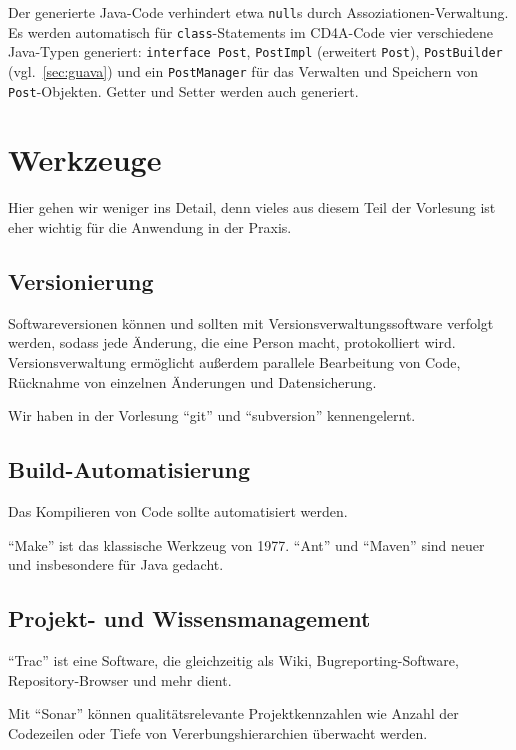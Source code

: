 \documentclass{panikzettel}
\begin{document}
Der generierte Java-Code verhindert etwa \lstinline{null}s durch Assoziationen-Verwaltung. Es werden automatisch für \lstinline{class}-Statements im CD4A-Code vier verschiedene Java-Typen generiert: \lstinline{interface Post}, \lstinline{PostImpl} (erweitert \lstinline{Post}), \lstinline{PostBuilder} (vgl.~\ref{sec:guava}) und ein \lstinline{PostManager} für das Verwalten und Speichern von \lstinline{Post}-Objekten. Getter und Setter werden auch generiert.

\section{Werkzeuge}

Hier gehen wir weniger ins Detail, denn vieles aus diesem Teil der Vorlesung ist eher wichtig für die Anwendung in der Praxis.

\subsection{Versionierung}

Softwareversionen können und sollten mit Versionsverwaltungssoftware verfolgt werden, sodass jede Änderung, die eine Person macht, protokolliert wird. Versionsverwaltung ermöglicht außerdem parallele Bearbeitung von Code, Rücknahme von einzelnen Änderungen und Datensicherung.

Wir haben in der Vorlesung ``git'' und ``subversion'' kennengelernt.

\subsection{Build-Automatisierung}

Das Kompilieren von Code sollte automatisiert werden.

``Make'' ist das klassische Werkzeug von 1977. ``Ant'' und ``Maven'' sind neuer und insbesondere für Java gedacht.

\subsection{Projekt- und Wissensmanagement}

``Trac'' ist eine Software, die gleichzeitig als Wiki, Bugreporting-Software, Repository-Browser und mehr dient.

Mit ``Sonar'' können qualitätsrelevante Projektkennzahlen wie Anzahl der Codezeilen oder Tiefe von Vererbungshierarchien überwacht werden.
\end{document}

